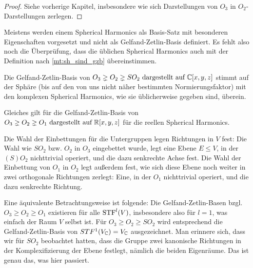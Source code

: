 \begin{proof}
	Siehe vorherige Kapitel, insbesondere wie sich Darstellungen von $O_3$ in $O_2$-Darstellungen zerlegen.
\end{proof}

\begin{remark}
	Meistens werden einem Spherical Harmonics als Basis-Satz mit besonderen Eigenschaften vorgesetzt und nicht als Gelfand-Zetlin-Basis definiert. Es fehlt also noch die Überprüfung, dass die üblichen Spherical Harmonics auch mit der Definition nach \ref{mt:sh_sind_gzb} übereinstimmen.
\end{remark}

\begin{lemma}
	Die Gelfand-Zetlin-Basis von $O_3\gneq O_2\gneq SO_2 \text{ dargestellt auf } \mathbb{C}[x,y,z]$ stimmt auf der Sphäre (bis auf den von uns nicht näher bestimmten Normierungsfaktor) mit den komplexen Spherical Harmonics, wie sie üblicherweise gegeben sind, überein.
    
    Gleiches gilt für die Gelfand-Zetlin-Basis von $O_3\gneq O_2\gneq O_1 \text{ dargestellt auf } \mathbb{R}[x,y,z]$ für die reellen Spherical Harmonics.
\end{lemma}

\begin{remark}
Die Wahl der Einbettungen für die Untergruppen legen Richtungen in $V$ fest: Die Wahl wie $SO_2$ bzw. $O_2$ in $O_3$ eingebettet wurde, legt eine Ebene $E\leq V$, in der $(S)O_2$ nichttrivial operiert, und die dazu senkrechte Achse fest. Die Wahl der Einbettung von $O_1$ in $O_2$ legt außerdem fest, wie sich diese Ebene noch weiter in zwei orthogonale Richtungen zerlegt: Eine, in der $O_1$ nichttrivial operiert, und die dazu senkrechte Richtung.

\medbreak
Eine äquivalente Betrachtungsweise ist folgende: Die Gelfand-Zetlin-Basen bzgl. $O_3\geq O_2\geq O_1$ existieren für alle $\operatorname{STF}^l(V)$, insbesondere also für $l=1$, was einfach der Raum $V$ selbst ist. Für $O_3\geq O_2\geq SO_2$ wird entsprechend die Gelfand-Zetlin-Basis von $STF^1(V_{\mathbb{C}}) = V_{\mathbb{C}}$ ausgezeichnet. Man erinnere sich, dass wir für $SO_2$ beobachtet hatten, dass die Gruppe zwei kanonische Richtungen in der Komplexifizierung der Ebene festlegt, nämlich die beiden Eigenräume. Das ist genau das, was hier passiert.
\end{remark}

